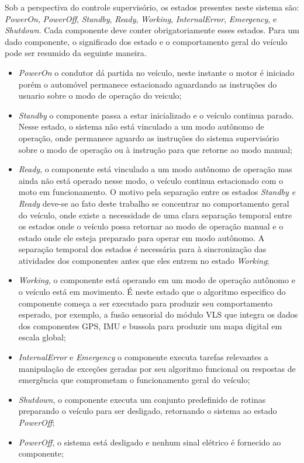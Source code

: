 \documentclass[conference]{IEEEtran}
\begin{document}
Sob a perspectiva do controle supervisório, os estados presentes neste sistema são: \textit{PowerOn}, \textit{PowerOff}, \textit{Standby}, \textit{Ready}, \textit{Working}, \textit{InternalError}, \textit{Emergency}, e \textit{Shutdown}.
Cada componente deve conter obrigatoriamente esses estados. Para um dado componente, o significado dos estado e o comportamento geral do veículo pode ser resumido da seguinte maneira.

\begin{itemize}

	\item \textit{PowerOn} o condutor dá partida no veículo, neste instante o motor é iniciado porém o automóvel permanece estacionado aguardando as instruções do usuario sobre o modo de operação do veiculo;
		
	\item \textit{Standby} o componente passa a estar inicializado e o veículo continua parado. Nesse estado, o sistema não está vinculado a um modo autônomo de operação, onde permanece aguardo as instruções do sistema supervisório sobre o modo de operação ou à instrução para que retorne ao modo manual;
	
	\item \textit{Ready}, o componente está vinculado a um modo autônomo de operação mas ainda não está operado nesse modo, o veículo continua estacionado com o moto em funcionamento. O motivo pela separação entre os estados \textit{Standby e Ready} deve-se ao fato deste trabalho se concentrar no comportamento geral do veículo, onde existe a necessidade de uma clara separação temporal entre os estados onde o veículo possa retornar ao modo de operação manual e o estado onde ele esteja preparado para operar em modo autônomo. A separação temporal dos estados é necessária para à sincronização das atividades dos componentes antes que eles entrem no estado \textit{Working};
	
	\item \textit{Working}, o componente está operando em um modo de operação autônomo e o veículo está em movimento. É neste estado que o algoritmo especifico do componente começa a ser executado para produzir seu comportamento esperado, por exemplo, a fusão sensorial do módulo VLS que integra os dados dos componentes GPS, IMU e bussola para produzir um mapa digital em escala global;
	
	\item \textit{InternalError} e \textit{Emergency} o componente executa tarefas relevantes a manipulação de exceções geradas por seu algoritmo funcional ou respostas de emergência que comprometam o funcionamento geral do veículo;
	
	\item \textit{Shutdown}, o componente executa um conjunto predefinido de rotinas preparando o veículo para ser desligado, retornando o sistema ao estado \textit{PowerOff};
	
	\item \textit{PowerOff}, o sistema está desligado e nenhum sinal elétrico é fornecido ao componente;
\end{itemize}
\end{document}
